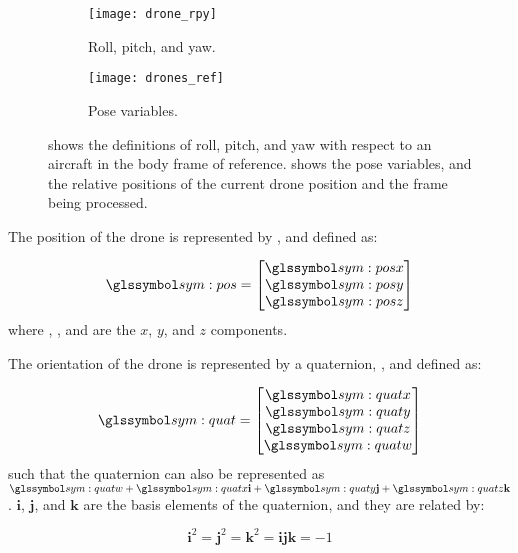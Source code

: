     \begin{figure}[h]
      \centering
      \begin{subfigure}[b]{0.45\textwidth}
	\texttt{[image: drone\_rpy]}
	\caption{Roll, pitch, and yaw.}
	\label{fig:drone_rpy}
      \end{subfigure}
      \hfill
      \begin{subfigure}[b]{0.45\textwidth}
	\texttt{[image: drones\_ref]}
	\caption{Pose variables.}
	\label{fig:drones_ref}
      \end{subfigure}
      \caption[Pose parameter definitions]{ shows the definitions of roll, pitch, and yaw with respect to an aircraft in the body frame of reference.  shows the pose variables, and the relative positions of the current drone position and the frame being processed.}
    \end{figure}

    The position of the drone is represented by , and defined as:

    \begin{equation}
      \sym{pos} = \begin{bmatrix}
	\sym{posx} \\
	\sym{posy} \\
	\sym{posz} \\
      \end{bmatrix}
    \end{equation}
    where , , and  are the $x$, $y$, and $z$ components.

    The orientation of the drone is represented by a quaternion, , and defined as:

    \begin{equation}
      \sym{quat} = \begin{bmatrix}
	\sym{quatx} \\
	\sym{quaty} \\
	\sym{quatz} \\
	\sym{quatw} \\
      \end{bmatrix}
    \end{equation}
    such that the quaternion can also be represented as $\sym{quatw} + \sym{quatx}\mathbf{i} + \sym{quaty}\mathbf{j} + \sym{quatz}\mathbf{k}$.
    $\mathbf{i}$, $\mathbf{j}$, and $\mathbf{k}$ are the basis elements of the quaternion, and they are related by:

    \begin{equation}
      \mathbf{i}^2 = \mathbf{j}^2 = \mathbf{k}^2 = \mathbf{ijk} = -1
    \end{equation}

